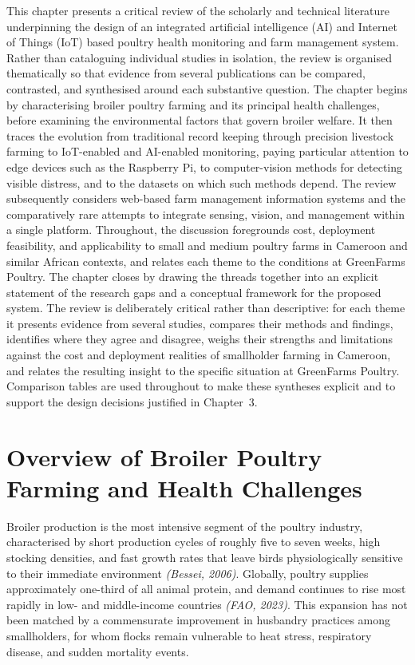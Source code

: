 \documentclass[12pt,a4paper]{report}
\begin{document}
This chapter presents a critical review of the scholarly and technical literature underpinning the design of an integrated artificial intelligence (AI) and Internet of Things (IoT) based poultry health monitoring and farm management system. Rather than cataloguing individual studies in isolation, the review is organised thematically so that evidence from several publications can be compared, contrasted, and synthesised around each substantive question. The chapter begins by characterising broiler poultry farming and its principal health challenges, before examining the environmental factors that govern broiler welfare. It then traces the evolution from traditional record keeping through precision livestock farming to IoT-enabled and AI-enabled monitoring, paying particular attention to edge devices such as the Raspberry Pi, to computer-vision methods for detecting visible distress, and to the datasets on which such methods depend. The review subsequently considers web-based farm management information systems and the comparatively rare attempts to integrate sensing, vision, and management within a single platform. Throughout, the discussion foregrounds cost, deployment feasibility, and applicability to small and medium poultry farms in Cameroon and similar African contexts, and relates each theme to the conditions at GreenFarms Poultry. The chapter closes by drawing the threads together into an explicit statement of the research gaps and a conceptual framework for the proposed system. The review is deliberately critical rather than descriptive: for each theme it presents evidence from several studies, compares their methods and findings, identifies where they agree and disagree, weighs their strengths and limitations against the cost and deployment realities of smallholder farming in Cameroon, and relates the resulting insight to the specific situation at GreenFarms Poultry. Comparison tables are used throughout to make these syntheses explicit and to support the design decisions justified in Chapter~3.

\section{Overview of Broiler Poultry Farming and Health Challenges}

Broiler production is the most intensive segment of the poultry industry, characterised by short production cycles of roughly five to seven weeks, high stocking densities, and fast growth rates that leave birds physiologically sensitive to their immediate environment \textit{(Bessei, 2006)}. Globally, poultry supplies approximately one-third of all animal protein, and demand continues to rise most rapidly in low- and middle-income countries \textit{(FAO, 2023)}. This expansion has not been matched by a commensurate improvement in husbandry practices among smallholders, for whom flocks remain vulnerable to heat stress, respiratory disease, and sudden mortality events.
\end{document}
